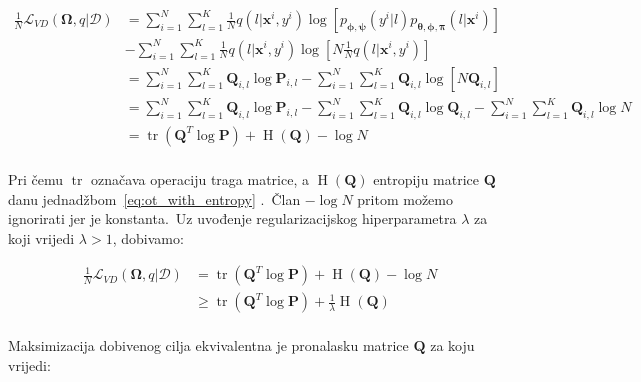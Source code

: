\documentclass[diplomskirad]{fer}
\begin{document}
\begin{equation}
  \begin{aligned}
    \frac{1}{N} \mathcal{L}_{VD}(\bm{\Omega}, q | \mathcal{D}) &= \sum_{i=1}^{N} \sum_{l=1}^{K} \frac{1}{N} q(l | \bm{x}^i, y^i) \log \left[p_{\bm{\phi}, \bm{\psi}}(y^i | l) p_{\bm{\theta}, \bm{\phi}, \bm{\pi}}(l | \bm{x}^i) \right] \\ 
                                                               &- \sum_{i=1}^{N} \sum_{l=1}^{K} \frac{1}{N} q(l | \bm{x}^i, y^i) \log \left[N \frac{1}{N} q(l | \bm{x}^i, y^i) \right] \\ 
                                                               &= \sum_{i=1}^{N} \sum_{l=1}^{K} \bm{Q}_{i, l} \log \bm{P}_{i, l} - \sum_{i=1}^{N} \sum_{l=1}^{K} \bm{Q}_{i, l} \log \left[N \bm{Q}_{i, l} \right] \\ 
                                                               &= \sum_{i=1}^{N} \sum_{l=1}^{K} \bm{Q}_{i, l} \log \bm{P}_{i, l} - \sum_{i=1}^{N} \sum_{l=1}^{K} \bm{Q}_{i, l} \log \bm{Q}_{i, l} - \sum_{i=1}^{N} \sum_{l=1}^{K} \bm{Q}_{i, l} \log N \\ 
                                                               &= \operatorname{tr}(\bm{Q}^T \log \bm{P}) + \operatorname{H}(\bm{Q}) - \log N \\ 
  \end{aligned}
  \label{eq:vibe_e_step_matrices}
\end{equation}

Pri čemu $\operatorname{tr}$ označava operaciju traga matrice, a $\operatorname{H}(\bm{Q})$ entropiju matrice $\bm{Q}$ danu jednadžbom~\ref{eq:ot_with_entropy} .\ Član $- \log N$ pritom možemo ignorirati jer je konstanta.\ 
Uz uvođenje regularizacijskog hiperparametra $\lambda$ za koji vrijedi $\lambda > 1$, dobivamo:

\begin{equation}
  \begin{aligned}
    \frac{1}{N} \mathcal{L}_{VD}(\bm{\Omega}, q | \mathcal{D}) &= \operatorname{tr}(\bm{Q}^T \log \bm{P}) + \operatorname{H}(\bm{Q}) - \log N \\ 
                                                               &\geq \operatorname{tr}(\bm{Q}^T \log \bm{P}) + \frac{1}{\lambda} \operatorname{H}(\bm{Q}) \\ 
  \end{aligned}
  \label{eq:vibe_e_step_final_eq}
\end{equation}

Maksimizacija dobivenog cilja ekvivalentna je pronalasku matrice $\bm{Q}$ za koju vrijedi:
\end{document}
